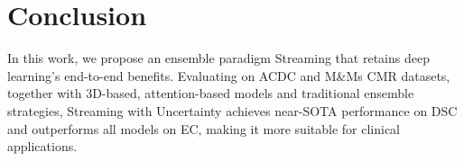 \section{Conclusion}
In this work, we propose an ensemble paradigm Streaming that retains deep learning's end-to-end benefits. Evaluating on ACDC and M\&Ms CMR datasets, together with 3D-based, attention-based models and traditional ensemble strategies, Streaming with Uncertainty achieves near-SOTA performance on DSC and outperforms all models on EC, making it more suitable for clinical applications.

